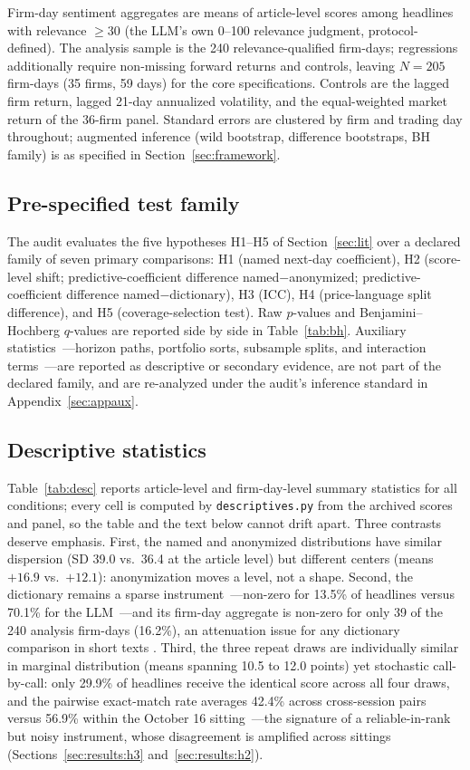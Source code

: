 Firm-day sentiment aggregates are means of article-level scores among headlines with relevance $\geq 30$ (the LLM's own 0--100 relevance judgment, protocol-defined). The analysis sample is the 240 relevance-qualified firm-days; regressions additionally require non-missing forward returns and controls, leaving $N=205$ firm-days (35 firms, 59 days) for the core specifications. Controls are the lagged firm return, lagged 21-day annualized volatility, and the equal-weighted market return of the 36-firm panel. Standard errors are clustered by firm and trading day throughout; augmented inference (wild bootstrap, difference bootstraps, BH family) is as specified in Section~\ref{sec:framework}.

\subsection{Pre-specified test family}

The audit evaluates the five hypotheses H1--H5 of Section~\ref{sec:lit} over a declared family of seven primary comparisons: H1 (named next-day coefficient), H2 (score-level shift; predictive-coefficient difference named$-$anonymized; predictive-coefficient difference named$-$dictionary), H3 (ICC), H4 (price-language split difference), and H5 (coverage-selection test). Raw $p$-values and Benjamini--Hochberg $q$-values are reported side by side in Table~\ref{tab:bh}. Auxiliary statistics~---horizon paths, portfolio sorts, subsample splits, and interaction terms~---are reported as descriptive or secondary evidence, are not part of the declared family, and are re-analyzed under the audit's inference standard in Appendix~\ref{sec:appaux}.

\subsection{Descriptive statistics}

Table~\ref{tab:desc} reports article-level and firm-day-level summary statistics for all conditions; every cell is computed by \texttt{descriptives.py} from the archived scores and panel, so the table and the text below cannot drift apart. Three contrasts deserve emphasis. First, the named and anonymized distributions have similar dispersion (SD 39.0 vs.\ 36.4 at the article level) but different centers (means $+16.9$ vs.\ $+12.1$): anonymization moves a level, not a shape. Second, the dictionary remains a sparse instrument~---non-zero for 13.5\% of headlines versus 70.1\% for the LLM~---and its firm-day aggregate is non-zero for only 39 of the 240 analysis firm-days (16.2\%), an attenuation issue for any dictionary comparison in short texts \citep{loughran2011}. Third, the three repeat draws are individually similar in marginal distribution (means spanning 10.5 to 12.0 points) yet stochastic call-by-call: only 29.9\% of headlines receive the identical score across all four draws, and the pairwise exact-match rate averages 42.4\% across cross-session pairs versus 56.9\% within the October 16 sitting~---the signature of a reliable-in-rank but noisy instrument, whose disagreement is amplified across sittings (Sections~\ref{sec:results:h3} and~\ref{sec:results:h2}).

